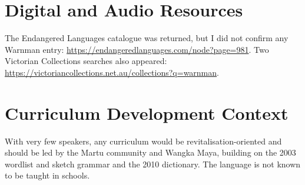 \documentclass[12pt]{article}
\begin{document}
\section{Digital and Audio Resources}
The Endangered Languages catalogue was returned, but I did not confirm any Warnman entry: \url{https://endangeredlanguages.com/node?page=981}. Two Victorian Collections searches also appeared: \url{https://victoriancollections.net.au/collections?q=warnman}.

\section{Curriculum Development Context}
With very few speakers, any curriculum would be revitalisation-oriented and should be led by the Martu community and Wangka Maya, building on the 2003 wordlist and sketch grammar and the 2010 dictionary. The language is not known to be taught in schools.
\end{document}
